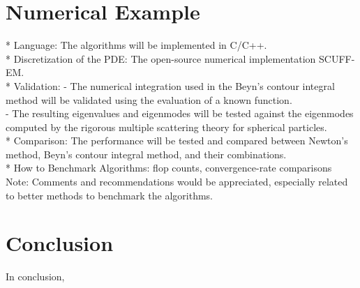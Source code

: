\documentclass[11pt,letterpaper]{article}
\begin{document}
\begin{multicols}{2}
\section{Numerical Example}
* Language: The algorithms will be implemented in C/C++.\\
* Discretization of the PDE: The open-source numerical implementation SCUFF-EM.\citep{SCUFF1}\\
* Validation: 
- The numerical integration used in the Beyn's contour integral method will be validated using the evaluation of a known function. \\
- The resulting eigenvalues and eigenmodes will be tested against the eigenmodes computed by the rigorous multiple scattering theory for spherical particles. \citep{xu1995electromagnetic}\\
* Comparison: The performance will be tested and compared between Newton's method, Beyn's contour integral method, and their combinations.  \\
* How to Benchmark Algorithms: flop counts, convergence-rate comparisons\\
Note: Comments and recommendations would be appreciated, especially related to better methods to benchmark the algorithms.  

\section{Conclusion}
In conclusion, 


\end{multicols}
\end{document}
